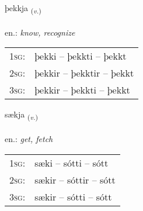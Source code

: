 \documentclass[frontgrid, backgrid]{flacards}\usepackage[]{graphicx}\usepackage[]{xcolor}
\begin{document}
\renewcommand{\flhead}{\vskip5pt \fboxsep=0pt {\small\bfseries\footnotesize Sagnorð | Verb}}
\renewcommand{\fcfoot}{\vskip5pt \fboxsep=0pt \hspace{2pt}{\small\bfseries\footnotesize 1K}}

\renewcommand{\blhead}{\vskip5pt {\small\bfseries\footnotesize Sagnorð | Verb }}
\renewcommand{\bcfoot}{\vskip5pt \hspace{2pt}{\small\bfseries\footnotesize 1K}}


{þekkja \small{\textsubscript{(\textit{v.})}} \\[1ex] %
\textphonetic{[θɛhca]} \\
en.: \emph{know, recognize} \\  [2ex]
\renewcommand*{\arraystretch}{0.8}
\begin{tabular}{p{1cm}l}
\textsc{1sg}: & þekki -- þekkti -- þekkt \\ 
\textsc{2sg}: & þekkir -- þekktir -- þekkt \\ 
\textsc{3sg}: & þekkir -- þekkti -- þekkt \\ 
\end{tabular}
}

\renewcommand{\flhead}{\vskip5pt \fboxsep=0pt {\small\bfseries\footnotesize Sagnorð | Verb}}
\renewcommand{\fcfoot}{\vskip5pt \fboxsep=0pt \hspace{2pt}{\small\bfseries\footnotesize 1K}}

\renewcommand{\blhead}{\vskip5pt {\small\bfseries\footnotesize Sagnorð | Verb }}
\renewcommand{\bcfoot}{\vskip5pt \hspace{2pt}{\small\bfseries\footnotesize 1K}}


{sækja \small{\textsubscript{(\textit{v.})}} \\[1ex] %
\textphonetic{[saiːca]} \\
en.: \emph{get, fetch} \\  [2ex]
\renewcommand*{\arraystretch}{0.8}
\begin{tabular}{p{1cm}l}
\textsc{1sg}: & sæki -- sótti -- sótt \\ 
\textsc{2sg}: & sækir -- sóttir -- sótt \\ 
\textsc{3sg}: & sækir -- sótti -- sótt \\ 
\end{tabular}
}
\end{document}
